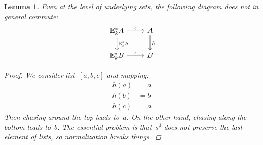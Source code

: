 \documentclass{article}
\theoremstyle{plain}
\newtheorem{lemma}[theorem]{Lemma}
\theoremstyle{definition}
\theoremstyle{remark}
\numberwithin{theorem}{section}
\begin{document}
\begin{lemma}
Even at the level of underlying sets, the following diagram does not in general commute:
\begin{equation*}
\begin{tikzcd}
\mathbb{E}^*_k A \ar[r, "\epsilon"] \ar[d, "\mathbb{E}^*_k h"] & A \ar[d, "h"]\\
\mathbb{E}^*_k B \ar[r, "\epsilon"] &  B
\end{tikzcd}
\end{equation*}
\begin{proof}
We consider list~$[a,b,c]$ and mapping:
\begin{align*}
    h(a) &= a\\
    h(b) &= b\\
    h(c) &= a
\end{align*}
Then chasing around the top leads to~$a$. On the other hand, chasing along the bottom leads to~$b$. The essential problem is that~$s^\emptyset$ does not preserve the last element of lists, so normalization breaks things.
\end{proof}

\end{lemma}
\end{document}
